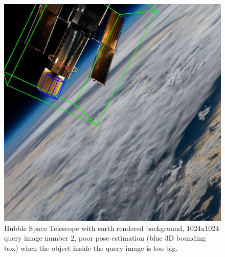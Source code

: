 \begin{figure}[h]
    \centering
    \includegraphics[width=0.70\linewidth]{data/fig1.jpg} %
    \caption{Hubble Space Telescope with earth rendered background, 1024x1024 query image number 2, poor pose estimation (blue 3D bounding box) when the object inside the query image is too big.}
    \label{fig:fig1}
\end{figure}

